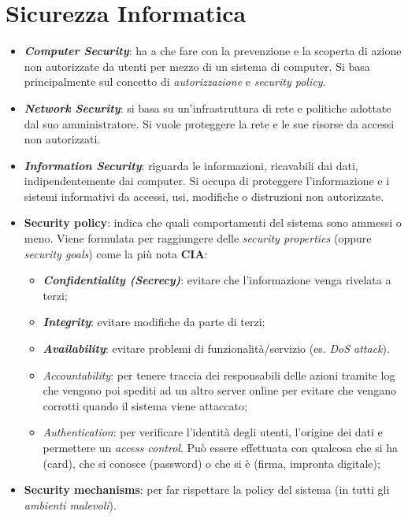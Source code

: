 \documentclass[11pt, a4paper, twoside, italian]{report}
\theoremstyle{plain}
\begin{document}
\section*{Sicurezza Informatica}
\begin{itemize}
	\item \textit{\textbf{Computer Security}}: ha a che fare con la prevenzione e la scoperta di azione non autorizzate da utenti per mezzo di un sistema di computer. Si basa principalmente sul concetto di \textit{autorizzazione} e \textit{security policy}.
	\item \textit{\textbf{Network Security}}: si basa su un'infrastruttura di rete e politiche adottate dal suo amministratore. Si vuole proteggere la rete e le sue risorse da accessi non autorizzati.
	\item \textit{\textbf{Information Security}}: riguarda le informazioni, ricavabili dai dati, indipendentemente dai computer. Si occupa di proteggere l'informazione e i sistemi informativi da accessi, usi, modifiche o distruzioni non autorizzate.
	\item \textbf{Security policy}: indica che quali comportamenti del sistema sono ammessi o meno. Viene formulata per raggiungere delle \textit{security properties} (oppure \textit{security goals}) come la più nota \textbf{CIA}:
	\begin{itemize}
		\item \textbf{\textit{Confidentiality (Secrecy)}}: evitare che l'informazione venga rivelata a terzi;
		\item \textbf{\textit{Integrity}}: evitare modifiche da parte di terzi;
		\item \textbf{\textit{Availability}}: evitare problemi di funzionalità/servizio (es. \textit{DoS attack}).
		\item \textit{Accountability}: per tenere traccia dei responsabili delle azioni tramite log che vengono poi spediti ad un altro server online per evitare che vengano corrotti quando il sistema viene attaccato;
		\item \textit{Authentication}: per verificare l'identità degli utenti, l'origine dei dati e permettere un \textit{access control}. Può essere effettuata con qualcosa che si ha (card), che si conosce (password) o che si è (firma, impronta digitale);
	\end{itemize}
	\item \textbf{Security mechanisms}: per far rispettare la policy del sistema (in tutti gli \textit{ambienti malevoli}).
\end{itemize}
\end{document}
